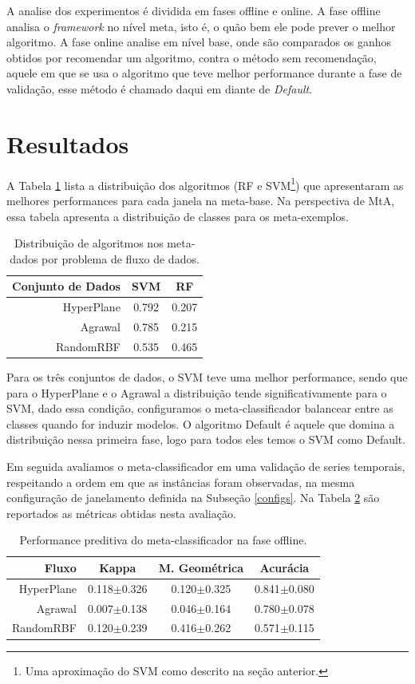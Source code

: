 \documentclass[conference,compsoc]{IEEEtran}
\begin{document}
A analise dos experimentos é dividida em fases offline e online. A fase offline analisa o \textit{framework} no nível meta, isto é, o quão bem ele pode prever o melhor algoritmo. A fase online analise em nível base, onde são comparados os ganhos obtidos por recomendar um algoritmo, contra o método sem recomendação, aquele em que se usa o algoritmo que teve melhor performance durante a fase de validação, esse método é chamado daqui em diante de \textit{Default}.

\section{Resultados}
\label{result}

A Tabela \ref{tab:algo_dist} lista a distribuição dos algoritmos (RF e SVM\footnote{Uma aproximação do SVM como descrito na seção anterior.}) que apresentaram as melhores performances para cada janela na meta-base. Na perspectiva de MtA, essa tabela apresenta a distribuição de classes para os meta-exemplos.

\begin{table}[ht]
\caption{Distribuição de algoritmos nos meta-dados por problema de fluxo de dados.}
\label{tab:algo_dist}
\centering
\begin{tabular}{r|c|c}
    Conjunto de Dados & SVM   & RF    \\ \hline
    HyperPlane        & 0.792 & 0.207 \\
    Agrawal           & 0.785 & 0.215 \\
    RandomRBF         & 0.535 & 0.465 \\
\end{tabular}
\end{table}

Para os três conjuntos de dados, o SVM teve uma melhor performance, sendo que para o HyperPlane e o Agrawal a distribuição tende significativamente para o SVM, dado essa condição, configuramos o meta-classificador balancear entre as classes quando for induzir modelos. O algoritmo Default é aquele que domina a distribuição nessa primeira fase, logo para todos eles temos o SVM como Default.

Em seguida avaliamos o meta-classificador em uma validação de series temporais, respeitando a ordem em que as instâncias foram observadas, na mesma configuração de janelamento definida na Subseção \ref{configs}. Na Tabela \ref{tab:offmetrics} são reportados as métricas obtidas nesta avaliação.

\begin{table}[ht]
\caption{Performance preditiva do meta-classificador na fase offline.}
\label{tab:offmetrics}
\centering
\begin{tabular}{r|c|c|c}
    Fluxo   & Kappa           & M. Geométrica   & Acurácia        \\ \hline
HyperPlane  & 0.118$\pm$0.326 & 0.120$\pm$0.325 & 0.841$\pm$0.080 \\
Agrawal     & 0.007$\pm$0.138 & 0.046$\pm$0.164 & 0.780$\pm$0.078 \\
RandomRBF   & 0.120$\pm$0.239 & 0.416$\pm$0.262 & 0.571$\pm$0.115 \\
\end{tabular}
\end{table}
\end{document}

